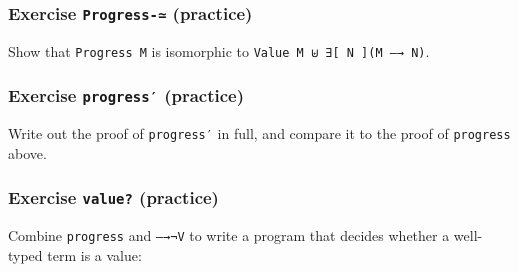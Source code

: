 \hypertarget{exercise-progress--practice}{%
\subsubsection{\texorpdfstring{Exercise \texttt{Progress-≃}
(practice)}{Exercise Progress-≃ (practice)}}\label{exercise-progress--practice}}

Show that \texttt{Progress\ M} is isomorphic to
\texttt{Value\ M\ ⊎\ ∃{[}\ N\ {]}(M\ —→\ N)}.

\begin{fence}
\begin{code}%
\>[0]\<%
\end{code}
\end{fence}

\hypertarget{exercise-progress-practice}{%
\subsubsection{\texorpdfstring{Exercise \texttt{progress′}
(practice)}{Exercise progress′ (practice)}}\label{exercise-progress-practice}}

Write out the proof of \texttt{progress′} in full, and compare it to the
proof of \texttt{progress} above.

\begin{fence}
\begin{code}%
\>[0]\<%
\end{code}
\end{fence}

\hypertarget{exercise-value-practice}{%
\subsubsection{\texorpdfstring{Exercise \texttt{value?}
(practice)}{Exercise value? (practice)}}\label{exercise-value-practice}}

Combine \texttt{progress} and \texttt{—→¬V} to write a program that
decides whether a well-typed term is a value:

\begin{fence}
\begin{code}%
\>[0]\<%
\\
\>[0][@{}l@{\AgdaIndent{0}}]%
\>[2]\AgdaSpace{}%
\AgdaSymbol{:}\AgdaSpace{}%
\AgdaSpace{}%
\AgdaSymbol{\{}\AgdaSpace{}%
\AgdaSymbol{\}}\AgdaSpace{}%
\AgdaSpace{}%
\AgdaSpace{}%
\AgdaSpace{}%
\AgdaSpace{}%
\AgdaSpace{}%
\AgdaSpace{}%
\AgdaSpace{}%
\AgdaSpace{}%
\AgdaSymbol{(}\AgdaSpace{}%
\AgdaSymbol{)}\<%
\end{code}
\end{fence}

